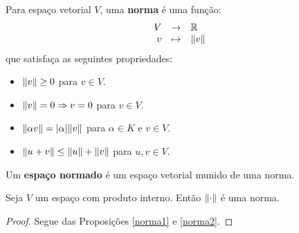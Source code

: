 \documentclass[11pt,twoside,a4paper]{book}
\begin{document}
\begin{definicao}
Para espaço vetorial $V$, uma \textbf{norma} é uma função:
\[
\begin{array}{rcl}
V&\rightarrow&\mathbb{R}\\
v&\mapsto&\norm{v}
\end{array}
\]
que satisfaça as seguintes propriedades:
\begin{itemize}
\item $\norm{v}\geq 0$ para $v\in V$. 
\item $\norm{v}=0\Rightarrow v=0$ para $v\in V$.
\item $\norm{\alpha v}=\abs{\alpha}\norm{v}$ para $\alpha\in K$ e $v\in V$.
\item $\norm{u+v}\leq\norm{u}+\norm{v}$ para $u,v\in V$.
\end{itemize}
\end{definicao}

\begin{definicao}
Um \textbf{espaço normado} é um espaço vetorial munido de uma norma.
\end{definicao}

\begin{proposicao}
Seja $V$ um espaço com produto interno. Então $\norm{\cdot}$ é uma norma.
\end{proposicao}
\begin{proof}
Segue das Proposições \ref{norma1} e \ref{norma2}.
\end{proof}
\end{document}
